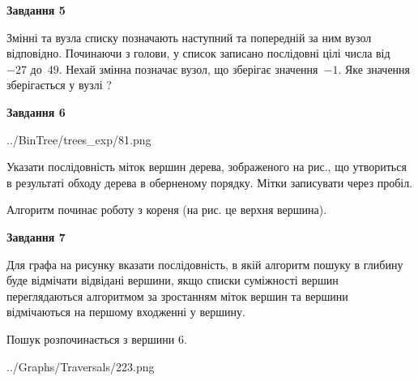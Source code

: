 \documentclass[12pt, ukrainian]{article}
\begin{document}
{\begin {large}
{\begin {center}\textbf{Завдання 5}\end {center}}\par
Змінні  та  вузла списку позначають наступний та попередній за ним вузол відповідно. Починаючи з голови, у список записано послідовні цілі числа від~$-27$ до~$49$. Нехай змінна  позначає вузол, що зберігає значення~$-1$.
Яке значення зберігається у вузлі  ?\par
\newpage

{\begin {center}\textbf{Завдання 6}\end {center}}\par

\begin{center}
	{../BinTree/trees_exp/81.png}
\end{center}
Указати послідовність міток вершин дерева, зображеного на рис., що утвориться в результаті обходу дерева в оберненому порядку. Мітки записувати через пробіл.\par Алгоритм починає роботу з кореня (на рис. це верхня вершина).\par
\newpage

{\begin {center}\textbf{Завдання 7}\end {center}}\par
Для графа на рисунку вказати послідовність, в якій алгоритм пошуку в глибину буде відмічати відвідані вершини, якщо списки суміжності вершин переглядаються алгоритмом за зростанням міток вершин та вершини відмічаються на першому вход\-женні у вершину.\par
Пошук розпочинається з вершини 6.\par

\begin{center}
	{../Graphs/Traversals/223.png}
\end{center}\par
\newpage


\end{large}}
\end{document}
